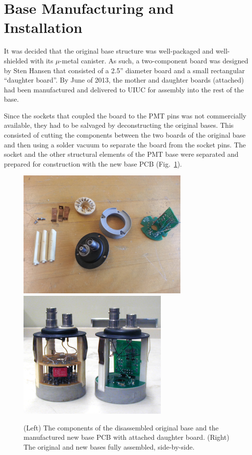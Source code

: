 \section{Base Manufacturing and Installation}

It was decided that the original base structure was well-packaged and well-shielded with its $\mu$-metal canister. As such, a two-component board was designed by Sten Hansen that consisted of a 2.5'' diameter board and a small rectangular ``daughter board''. By June of 2013, the mother and daughter boards (attached) had been manufactured and delivered to UIUC for assembly into the rest of the base.

Since the sockets that coupled the board to the PMT pins was not commercially available, they had to be salvaged by deconstructing the original bases. This consisted of cutting the components between the two boards of the original base and then using a solder vacuum to separate the board from the socket pins. The socket and the other structural elements of the PMT base were separated and prepared for construction with the new base PCB (Fig.~\ref{fig:old-new-base}).

\begin{figure}[h]
	\centerline{
		\mbox{\includegraphics[height=2.5in]{figures/pmtupgrade/disassembled-base.jpg} \includegraphics[height=2.5in]{figures/pmtupgrade/old-new-base.png}}}
	\caption{(Left) The components of the disassembled original base and the manufactured new base PCB with attached daughter board. (Right) The original and new bases fully assembled, side-by-side.}
	\label{fig:old-new-base}
\end{figure}

